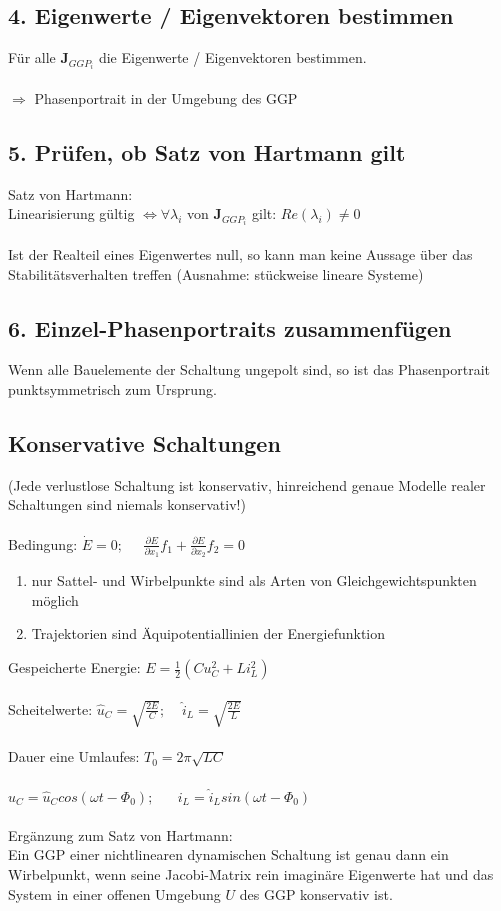 \documentclass[a4paper,twocolumn,10pt]{article}
\begin{document}
\subsection*{4. Eigenwerte / Eigenvektoren bestimmen}
Für alle $\textbf{J}_{GGP_i}$ die Eigenwerte / Eigenvektoren bestimmen.\\\\
$\Rightarrow$ Phasenportrait in der Umgebung des GGP
\subsection*{5. Prüfen, ob Satz von Hartmann gilt}
Satz von Hartmann:\\
Linearisierung gültig $\Leftrightarrow \forall \lambda_i$ von $\textbf{J}_{GGP_i}$ gilt: $Re(\lambda_i)\neq 0$\\\\
Ist der Realteil eines Eigenwertes null, so kann man keine Aussage über das Stabilitätsverhalten treffen (Ausnahme: stückweise lineare Systeme)
\subsection*{6. Einzel-Phasenportraits zusammenfügen}
Wenn alle Bauelemente der Schaltung ungepolt sind, so ist das Phasenportrait punktsymmetrisch zum Ursprung.

\subsection*{Konservative Schaltungen}
(Jede verlustlose Schaltung ist konservativ, hinreichend genaue Modelle realer Schaltungen sind niemals konservativ!)\\\\
Bedingung: $\dot E=0;\;\;\;\;\;\frac{\partial E}{\partial x_1}f_1+\frac{\partial E}{\partial x_2}f_2=0$
\begin{enumerate}[label=-,leftmargin=3mm]
	\item nur Sattel- und Wirbelpunkte sind als Arten von Gleichgewichtspunkten möglich
	\item Trajektorien sind Äquipotentiallinien der Energiefunktion
\end{enumerate}
Gespeicherte Energie: $E=\frac{1}{2}(Cu_C^2+Li_L^2)$\\\\
Scheitelwerte: $\hat{u}_C=\sqrt{\frac{2E}{C}};\;\;\;\;\hat{i}_L=\sqrt{\frac{2E}{L}}$\\\\
Dauer eine Umlaufes: $T_0=2\pi \sqrt{LC}$\\\\
$u_C=\hat{u}_C cos(\omega t-\Phi_0);\;\;\;\;\;\;i_L=\hat{i}_L sin(\omega t-\Phi_0)$\\\\
Ergänzung zum Satz von Hartmann:\\
Ein GGP einer nichtlinearen dynamischen Schaltung ist genau dann ein Wirbelpunkt, wenn seine Jacobi-Matrix rein imaginäre Eigenwerte hat und das System in einer offenen Umgebung $U$ des GGP konservativ ist.
\end{document}
